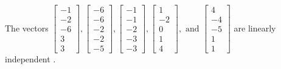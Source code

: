 \begin{exercise}
\begin{exerciseStatement}
  \end{exerciseStatement}
  \begin{exerciseAnswer}
   The vectors \(\left[\begin{array}{r}
-1 \\
-2 \\
-6 \\
3 \\
3
\end{array}\right] , \left[\begin{array}{r}
-6 \\
-6 \\
-2 \\
-2 \\
-5
\end{array}\right] , \left[\begin{array}{r}
-1 \\
-1 \\
-2 \\
-3 \\
-3
\end{array}\right] , \left[\begin{array}{r}
1 \\
-2 \\
0 \\
1 \\
4
\end{array}\right] , \text{ and } \left[\begin{array}{r}
4 \\
-4 \\
-5 \\
1 \\
1
\end{array}\right]\) are 
  	 linearly independent  .
  


  \end{exerciseAnswer}
\end{exercise}